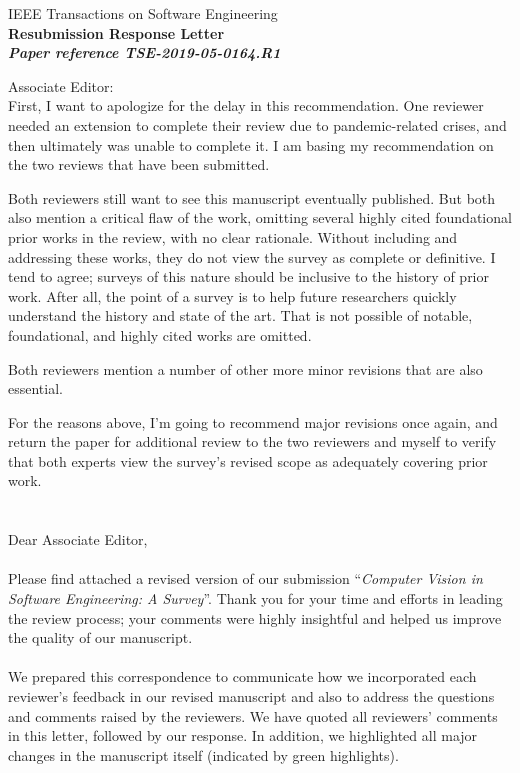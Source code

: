 \documentclass[12pt]{article}
\newcommand\response[1]{\textcolor{responseColor}{\\#1\\}}
\begin{document}
\setlength{\parindent}{0pt}






\begin{center}
\LARGE{{IEEE Transactions on Software Engineering} \\ \bf {Resubmission Response Letter} \\ \normalsize \emph{Paper reference TSE-2019-05-0164.R1}} %
\end{center}

Associate Editor: \\ 
First, I want to apologize for the delay in this recommendation. One reviewer needed an extension to complete their review due to pandemic-related crises, and then ultimately was unable to complete it. I am basing my recommendation on the two reviews that have been submitted.

Both reviewers still want to see this manuscript eventually published. But both also mention a critical flaw of the work, omitting several highly cited foundational prior works in the review, with no clear rationale. Without including and addressing these works, they do not view the survey as complete or definitive. I tend to agree; surveys of this nature should be inclusive to the history of prior work. After all, the point of a survey is to help future researchers quickly understand the history and state of the art. That is not possible of notable, foundational, and highly cited works are omitted.

Both reviewers mention a number of other more minor revisions that are also essential.

For the reasons above, I'm going to recommend major revisions once again, and return the paper for additional review to the two reviewers and myself to verify that both experts view the survey's revised scope as adequately covering prior work.
\\ \\ 
\response{
Dear Associate Editor, 
\\ \\
Please find attached a revised version of our submission 
``\textit{Computer Vision in Software Engineering: A Survey}''. 
Thank you for your time and efforts in leading the review 
process; your comments were highly insightful and helped us 
improve the quality of our manuscript.
\\ \\
We prepared this correspondence to communicate how we 
incorporated each reviewer's feedback in our revised manuscript 
and also to address the questions and comments raised by the 
reviewers. We have quoted all reviewers' comments in this 
letter, followed by our response.
In addition, we highlighted all major changes in the manuscript 
itself (indicated by green highlights).
}
\vspace{5mm}
\end{document}
